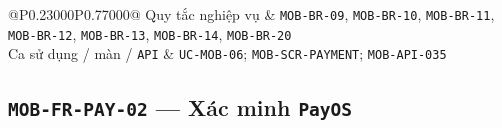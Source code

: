 \begin{longtable}{@{}P{0.23000\SRSWidth}P{0.77000\SRSWidth}@{}}
Quy tắc nghiệp vụ & \texttt{MOB-\allowbreak{}BR-\allowbreak{}09}, \texttt{MOB-\allowbreak{}BR-\allowbreak{}10}, \texttt{MOB-\allowbreak{}BR-\allowbreak{}11}, \texttt{MOB-\allowbreak{}BR-\allowbreak{}12}, \texttt{MOB-\allowbreak{}BR-\allowbreak{}13}, \texttt{MOB-\allowbreak{}BR-\allowbreak{}14}, \texttt{MOB-\allowbreak{}BR-\allowbreak{}20} \\[3pt]
Ca sử dụng /\allowbreak{} màn /\allowbreak{} \texttt{API} & \texttt{UC-\allowbreak{}MOB-\allowbreak{}06}; \texttt{MOB-\allowbreak{}SCR-\allowbreak{}PAYMENT}; \texttt{MOB-\allowbreak{}API-\allowbreak{}035} \\[3pt]
\end{longtable}
\endgroup

\subsection{\texttt{MOB-\allowbreak{}FR-\allowbreak{}PAY-\allowbreak{}02} — Xác minh \texttt{Pay\allowbreak{}OS}}
\begingroup
\fontsize{9.5}{12}\selectfont
\setlength{\SRSWidth}{\dimexpr\linewidth-2\tabcolsep\relax}
